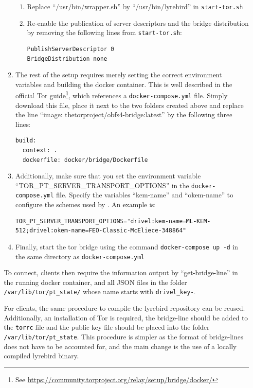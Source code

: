 \begin{enumerate}
\begin{enumerate}
        \item Replace ``/usr/bin/wrapper.sh'' by ``/usr/bin/lyrebird'' in \texttt{start-tor.sh}

        \item Re-enable the publication of server descriptors and the bridge distribution by removing the following lines from \texttt{start-tor.sh}:
        \begin{lstlisting}
PublishServerDescriptor 0
BridgeDistribution none
        \end{lstlisting}
    \end{enumerate}
    \label{bul:prod-use-changes}

    \item The rest of the setup requires merely setting the correct environment variables and building the docker container. This is well described in the official Tor guide\footnote{See \url{https://community.torproject.org/relay/setup/bridge/docker/}}, which references a \texttt{docker-compose.yml} file. Simply download this file, place it next to the two folders created above and replace the line ``image: thetorproject/obfs4-bridge:latest'' by the following three lines:
    \begin{lstlisting}
build:
  context: .
  dockerfile: docker/bridge/Dockerfile
    \end{lstlisting}

    \item Additionally, make sure that you set the environment variable ``TOR\_PT\_SERVER\_TRANSPORT\_OPTIONS'' in the \texttt{docker-compose.yml} file. Specify the variables ``kem-name'' and ``okem-name'' to configure the schemes used by \drivel{}. An example is:
    \begin{lstlisting}
TOR_PT_SERVER_TRANSPORT_OPTIONS="drivel:kem-name=ML-KEM-512;drivel:okem-name=FEO-Classic-McEliece-348864"
    \end{lstlisting}

    \item Finally, start the tor bridge using the command \texttt{docker-compose up -d} in the same directory as \texttt{docker-compose.yml}
\end{enumerate}

To connect, clients then require the information output by ``get-bridge-line'' in the running docker container, and all JSON files in the folder \texttt{/var/lib/tor/pt\_state/} whose name starts with \texttt{drivel\_key-}.

For clients, the same procedure to compile the lyrebird repository can be reused. Additionally, an installation of Tor is required, the bridge-line should be added to the \texttt{torrc} file and the public key file should be placed into the folder \texttt{/var/lib/tor/pt\_state}. This procedure is simpler as the format of bridge-lines does not have to be accounted for, and the main change is the use of a locally compiled lyrebird binary.

